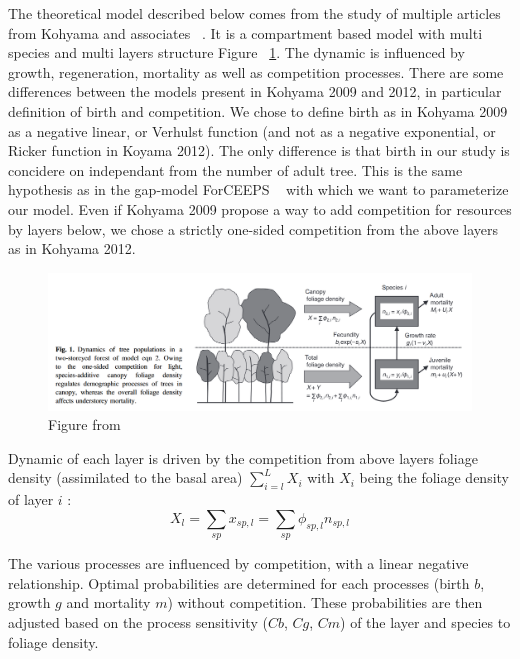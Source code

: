 \documentclass{article}
\begin{document}
The theoretical model described below comes from the study of multiple articles from Kohyama and associates ~\autocite{kohyamaStratificationTheoryPlant2009, kohyamaOnesidedCompetitionLight2012}.
It is a compartment based model with multi species and multi layers structure Figure ~\ref{fig:fig_model}. The dynamic is influenced by growth, regeneration, mortality as well as competition processes. There are some differences between the models present in Kohyama 2009 and 2012, in particular definition of birth and competition. We chose to define birth as in Kohyama 2009 as a negative linear, or Verhulst function (and not as a negative exponential, or Ricker function in Koyama 2012). The only difference is that birth in our study is concidere on independant from the number of adult tree. This is the same hypothesis as in the gap-model ForCEEPS ~\autocite{morinUsingForestGap2020} with which we want to parameterize our model. Even if Kohyama 2009 propose a way to add competition for resources by layers below, we chose a strictly one-sided competition from the above layers as in Kohyama 2012.

\begin{figure}[h]
    \centering
    \includegraphics[width=\textwidth]{Figure/Fig_model_Kohyama.png}
    \caption{Figure from ~\autocite{kohyamaOnesidedCompetitionLight2012}}
    \label{fig:fig_model}
\end{figure}

Dynamic of each layer is driven by the competition from above layers foliage density (assimilated to the basal area) $\sum_{i = l}^{L} X_i$ with $X_i$ being the foliage density of layer $i$ :
\begin{equation}
    X_{l} = \sum_{sp} x_{sp,l} = \sum_{sp} \phi_{sp,l} n_{sp,l}
\end{equation}

The various processes are influenced by competition, with a linear negative relationship. Optimal probabilities are determined for each processes (birth $b$, growth $g$ and mortality $m$) without competition. These probabilities are then adjusted based on the process sensitivity ($Cb$, $Cg$, $Cm$) of the layer and species to foliage density.
\end{document}
